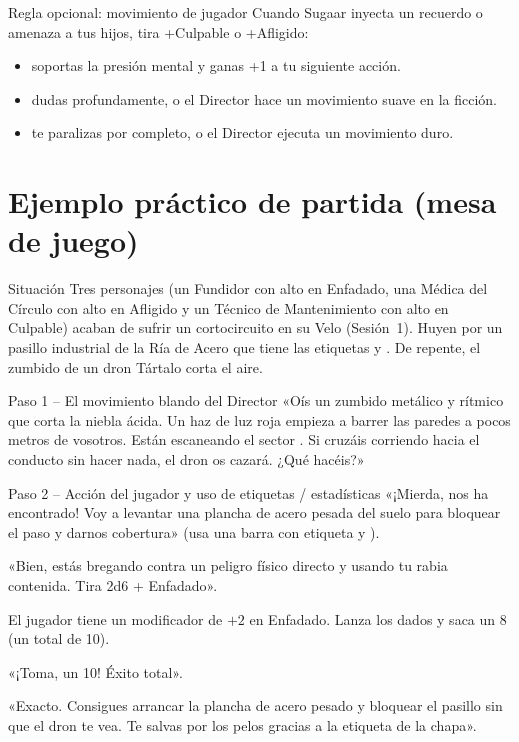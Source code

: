 \begin{CajaRegla}{Regla opcional: movimiento de jugador}
 Cuando Sugaar inyecta un recuerdo o amenaza a tus hijos, tira +Culpable o +Afligido:
\begin{itemize}
  \item {} soportas la presión mental y ganas +1 a tu siguiente acción.
  \item {} dudas profundamente, o el Director hace un movimiento suave en la ficción.
  \item {} te paralizas por completo, o el Director ejecuta un movimiento duro.
\end{itemize}
\end{CajaRegla}

\section{Ejemplo práctico de partida (mesa de juego)}

\begin{CajaEjemplo}{Situación}
Tres personajes (un Fundidor con alto en Enfadado, una Médica del Círculo con alto en Afligido y un Técnico de Mantenimiento con alto en Culpable) acaban de sufrir un cortocircuito en su Velo (Sesión~1). Huyen por un pasillo industrial de la Ría de Acero que tiene las etiquetas  y . De repente, el zumbido de un dron Tártalo corta el aire.
\end{CajaEjemplo}

\begin{CajaEjemplo}{Paso 1 -- El movimiento blando del Director}
 «Oís un zumbido metálico y rítmico que corta la niebla ácida. Un haz de luz roja empieza a barrer las paredes a pocos metros de vosotros. Están escaneando el sector . Si cruzáis corriendo hacia el conducto sin hacer nada, el dron os cazará. ¿Qué hacéis?»
\end{CajaEjemplo}

\begin{CajaEjemplo}{Paso 2 -- Acción del jugador y uso de etiquetas / estadísticas}
 «¡Mierda, nos ha encontrado! Voy a levantar una plancha de acero pesada del suelo para bloquear el paso y darnos cobertura» (usa una barra con etiqueta  y ).\par
{} «Bien, estás bregando contra un peligro físico directo y usando tu rabia contenida. Tira 2d6 + Enfadado».\par
El jugador tiene un modificador de $+2$ en Enfadado. Lanza los dados y saca un 8 (un total de 10).\par
{} «¡Toma, un 10! Éxito total».\par
{} «Exacto. Consigues arrancar la plancha de acero pesado y bloquear el pasillo sin que el dron te vea. Te salvas por los pelos gracias a la etiqueta  de la chapa».
\end{CajaEjemplo}

